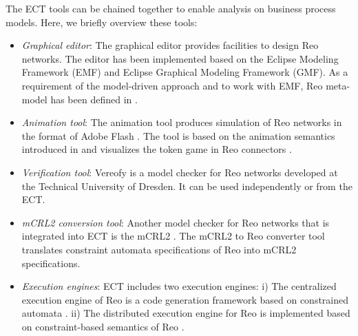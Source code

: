 The ECT tools can be chained together to enable analysis on business process models.  
Here, we briefly overview these tools: 

\begin{itemize}
\item \emph{Graphical editor}: 
The graphical editor provides facilities to design Reo networks. The editor has been implemented based on the Eclipse Modeling Framework (EMF) \cite{emf} and Eclipse Graphical Modeling Framework (GMF).
As a requirement of the model-driven approach and to work with EMF, Reo meta-model has been defined in \cite{Krause11a} \cite{Krause201123}. 
%
\item \emph{Animation tool}:
 The animation tool produces simulation of Reo networks in the format of Adobe Flash \cite{flash}. The tool is based on the animation semantics introduced in  \cite{davidtez} and
 visualizes the token game in Reo connectors  \cite{Krause11a}.

\item \emph{Verification tool}: %
 Vereofy \cite{vereofypaper} is a model checker for Reo networks developed at the Technical University of Dresden. It can be used independently or from the ECT.

\item \emph{mCRL2 conversion tool}: 
 Another model checker for Reo networks that is integrated into ECT is the mCRL2 \cite{mcrl2}.
The mCRL2 to Reo converter tool translates constraint automata specifications of Reo into mCRL2 specifications.%

\item \emph{Execution engines}: ECT includes two execution engines:  i) The centralized execution engine of Reo is a code generation framework based on constrained automata \cite{BaierCA}. ii) The distributed execution engine for Reo is implemented based on constraint-based semantics of Reo \cite{JoseThesis}.


\end{itemize}
